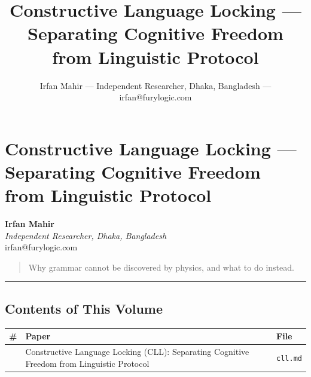 \documentclass[
  11pt,
  a4paper,
]{article}
\title{Constructive Language Locking --- Separating Cognitive Freedom
from Linguistic Protocol}
\author{Irfan Mahir --- Independent Researcher, Dhaka, Bangladesh ---
irfan@furylogic.com}
\date{}
\begin{document}
\maketitle

{
\hypersetup{linkcolor=}
\setcounter{tocdepth}{2}
\tableofcontents
}
\section{Constructive Language Locking --- Separating Cognitive Freedom
from Linguistic
Protocol}\label{constructive-language-locking-separating-cognitive-freedom-from-linguistic-protocol}

\textbf{Irfan Mahir}\\
\emph{Independent Researcher, Dhaka, Bangladesh}\\
irfan@furylogic.com

\begin{quote}
Why grammar cannot be discovered by physics, and what to do instead.
\end{quote}

\begin{center}\rule{0.5\linewidth}{0.5pt}\end{center}

\subsection{Contents of This Volume}\label{contents-of-this-volume}

\begin{longtable}[]{@{}
  >{\raggedright\arraybackslash}p{}
  >{\raggedright\arraybackslash}p{}
  >{\raggedright\arraybackslash}p{}@{}}
\toprule\noalign{}
\begin{minipage}[b]{\linewidth}\raggedright
\#
\end{minipage} & \begin{minipage}[b]{\linewidth}\raggedright
Paper
\end{minipage} & \begin{minipage}[b]{\linewidth}\raggedright
File
\end{minipage} \\
\midrule\noalign{}
\endhead
\bottomrule\noalign{}
\endlastfoot
1 & Constructive Language Locking (CLL): Separating Cognitive Freedom
from Linguistic Protocol & \texttt{cll.md} \\
\end{longtable}
\end{document}
